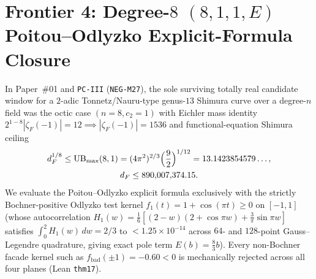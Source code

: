 \documentclass[11pt]{amsart}
\numberwithin{equation}{section}
\theoremstyle{plain}
\theoremstyle{definition}\newtheorem{definition}[theorem]{Definition}
\theoremstyle{remark}\newtheorem{remark}[theorem]{Remark}
\begin{document}
\section{Frontier 4: Degree-\texorpdfstring{$8$}{8} \texorpdfstring{$(8,1,1,E)$}{(8,1,1,E)} Poitou--Odlyzko Explicit-Formula Closure}\label{sec:frontier4}

In Paper~\#01 \cite{ergentics2026pc} and \texttt{PC-III} (\texttt{NEG-M27}), the sole surviving totally real candidate window for a $2$-adic Tonnetz/Nauru-type genus-$13$ Shimura curve over a degree-$n$ field was the octic case $(n=8, c_2=1)$ with Eichler mass identity $2^{1-8}|\zeta_F(-1)| = 12 \implies |\zeta_F(-1)| = 1536$ and functional-equation Shimura ceiling
\begin{equation}\label{eq:ub_max_deg8}
\begin{gathered}
d_F^{1/8} \le \mathrm{UB}_{\max}(8,1) = (4\pi^2)^{2/3}\Bigl(\frac{9}{2}\Bigr)^{1/12} = 13.1423854579\ldots, \\
d_F \le 890{,}007{,}374.15.
\end{gathered}
\end{equation}
We evaluate the Poitou--Odlyzko explicit formula \cite{poitou1977,odlyzko1990} exclusively with the strictly Bochner-positive Odlyzko test kernel $f_1(t) = 1+\cos(\pi t) \ge 0$ on $[-1,1]$ (whose autocorrelation $H_1(w) = \frac{1}{6}[(2-w)(2+\cos\pi w)+\frac{3}{\pi}\sin\pi w]$ satisfies $\int_0^2 H_1(w)\,dw = 2/3$ to $< 1.25\times 10^{-14}$ across $64$- and $128$-point Gauss--Legendre quadrature, giving exact pole term $E(b) = \frac{8}{3}b$). Every non-Bochner facade kernel such as $f_{\mathrm{bad}}(\pm 1) = -0.60 < 0$ is mechanically rejected across all four planes (Lean \texttt{thm17}).
\end{document}
